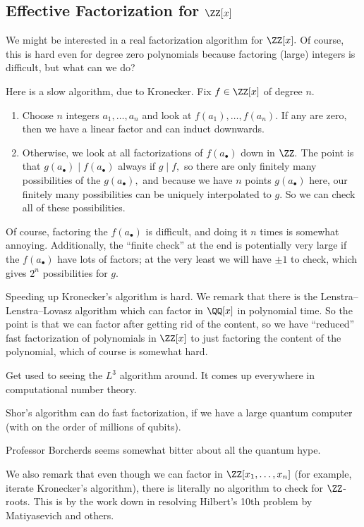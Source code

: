 \documentclass[../notes.tex]{subfiles}
\begin{document}
\subsection{Effective Factorization for \texorpdfstring{$\ZZ[x]$}{}}
We might be interested in a real factorization algorithm for $\ZZ[x].$ Of course, this is hard even for degree zero polynomials because factoring (large) integers is difficult, but what can we do?

Here is a slow algorithm, due to Kronecker. Fix $f\in\ZZ[x]$ of degree $n.$
\begin{enumerate}
	\item Choose $n$ integers $a_1,\ldots,a_n$ and look at $f(a_1),\ldots,f(a_n).$ If any are zero, then we have a linear factor and can induct downwards.
	\item Otherwise, we look at all factorizations of $f(a_\bullet)$ down in $\ZZ.$ The point is that $g(a_\bullet)\mid f(a_\bullet)$ always if $g\mid f,$ so there are only finitely many possibilities of the $g(a_\bullet),$ and because we have $n$ points $g(a_\bullet)$ here, our finitely many possibilities can be uniquely interpolated to $g.$ So we can check all of these possibilities.
\end{enumerate}
Of course, factoring the $f(a_\bullet)$ is difficult, and doing it $n$ times is somewhat annoying. Additionally, the ``finite check'' at the end is potentially very large if the $f(a_\bullet)$ have lots of factors; at the very least we will have $\pm1$ to check, which gives $2^n$ possibilities for $g.$

Speeding up Kronecker's algorithm is hard. We remark that there is the Lenstra--Lenstra--Lovasz algorithm which can factor in $\QQ[x]$ in polynomial time. So the point is that we can factor after getting rid of the content, so we have ``reduced'' fast factorization of polynomials in $\ZZ[x]$ to just factoring the content of the polynomial, which of course is somewhat hard.
\begin{remark}[Nir]
	Get used to seeing the $L^3$ algorithm around. It comes up everywhere in computational number theory.
\end{remark}
\begin{remark}
	Shor's algorithm can do fast factorization, if we have a large quantum computer (with on the order of millions of qu{}bits).
\end{remark}
\begin{remark}
	Professor Borcherds seems somewhat bitter about all the quantum hype.
\end{remark}
We also remark that even though we can factor in $\ZZ[x_1,\ldots,x_n]$ (for example, iterate Kronecker's algorithm), there is literally no algorithm to check for $\ZZ$-roots. This is by the work down in resolving Hilbert's 10th problem by Matiyasevich and others.
\end{document}

